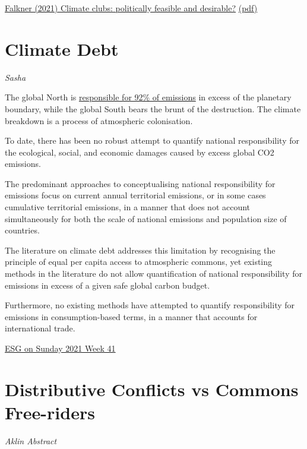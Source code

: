 \documentclass[
]{book}
\begin{document}
\href{https://www.tandfonline.com/doi/full/10.1080/14693062.2021.1967717}{Falkner (2021) Climate clubs: politically feasible and desirable?}
\href{pdf/Falkner_2021_Climate_Clubs.pdf}{(pdf)}

\hypertarget{climate-debt}{%
\section{Climate Debt}\label{climate-debt}}

\emph{Sasha}

The global North is \href{https://www.thelancet.com/journals/lanplh/article/PIIS2542-5196(20)30196-0/fulltext}{responsible for 92\% of emissions} in excess of the planetary boundary, while the global South bears the brunt of the destruction. The climate breakdown is a process of atmospheric colonisation.

To date, there has been no robust attempt to quantify national responsibility for the ecological, social, and economic damages caused by excess global CO2 emissions.

The predominant approaches to conceptualising national responsibility for emissions focus on current annual territorial emissions, or in some cases cumulative territorial emissions, in a manner that does not account simultaneously for both the scale of national emissions and population size of countries.

The literature on climate debt addresses this limitation by recognising the principle of equal per capita access to atmospheric commons, yet existing methods in the literature do not allow quantification of national responsibility for emissions in excess of a given safe global carbon budget.

Furthermore, no existing methods have attempted to quantify responsibility for emissions in consumption-based terms, in a manner that accounts for international trade.

\href{https://esgonasunday.substack.com/p/week-41-the-cop-drama-is-coming-the}{ESG on Sunday 2021 Week 41}

\hypertarget{distributive-conflicts-vs-commons-free-riders}{%
\section{Distributive Conflicts vs Commons Free-riders}\label{distributive-conflicts-vs-commons-free-riders}}

\emph{Aklin Abstract}
\end{document}
